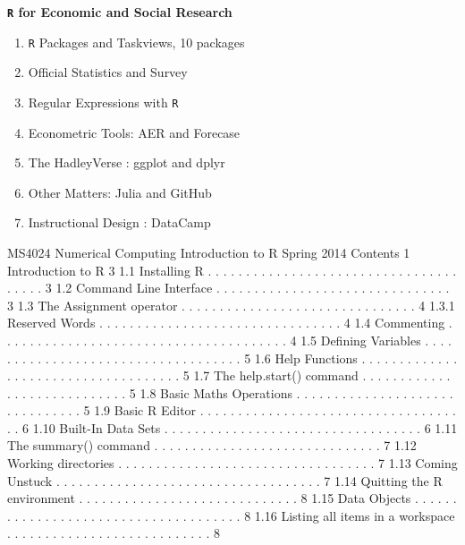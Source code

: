 \documentclass{beamer}
\begin{document}
\begin{frame}
\textbf{\texttt{R} for Economic and Social Research}
\begin{enumerate}
\item \texttt{R} Packages and Taskviews, 10 packages
\item Official Statistics and Survey 
\item Regular Expressions with \texttt{R}
\item Econometric Tools: AER and Forecase
\item The HadleyVerse : ggplot and dplyr
\item Other Matters:  Julia and GitHub
\item Instructional Design : DataCamp
\end{enumerate}

\end{frame}
MS4024 Numerical Computing Introduction to R Spring 2014
Contents
1 Introduction to R 3
1.1 Installing R . . . . . . . . . . . . . . . . . . . . . . . . . . . . . . . . . . . . . . 3
1.2 Command Line Interface . . . . . . . . . . . . . . . . . . . . . . . . . . . . . . . 3
1.3 The Assignment operator . . . . . . . . . . . . . . . . . . . . . . . . . . . . . . . 4
1.3.1 Reserved Words . . . . . . . . . . . . . . . . . . . . . . . . . . . . . . . . 4
1.4 Commenting . . . . . . . . . . . . . . . . . . . . . . . . . . . . . . . . . . . . . . 4
1.5 Defining Variables . . . . . . . . . . . . . . . . . . . . . . . . . . . . . . . . . . . 5
1.6 Help Functions . . . . . . . . . . . . . . . . . . . . . . . . . . . . . . . . . . . . 5
1.7 The help.start() command . . . . . . . . . . . . . . . . . . . . . . . . . . . . 5
1.8 Basic Maths Operations . . . . . . . . . . . . . . . . . . . . . . . . . . . . . . . 5
1.9 Basic R Editor . . . . . . . . . . . . . . . . . . . . . . . . . . . . . . . . . . . . 6
1.10 Built-In Data Sets . . . . . . . . . . . . . . . . . . . . . . . . . . . . . . . . . . 6
1.11 The summary() command . . . . . . . . . . . . . . . . . . . . . . . . . . . . . . 7
1.12 Working directories . . . . . . . . . . . . . . . . . . . . . . . . . . . . . . . . . . 7
1.13 Coming Unstuck . . . . . . . . . . . . . . . . . . . . . . . . . . . . . . . . . . . 7
1.14 Quitting the R environment . . . . . . . . . . . . . . . . . . . . . . . . . . . . . 8
1.15 Data Objects . . . . . . . . . . . . . . . . . . . . . . . . . . . . . . . . . . . . . 8
1.16 Listing all items in a workspace . . . . . . . . . . . . . . . . . . . . . . . . . . . 8
\end{document}
